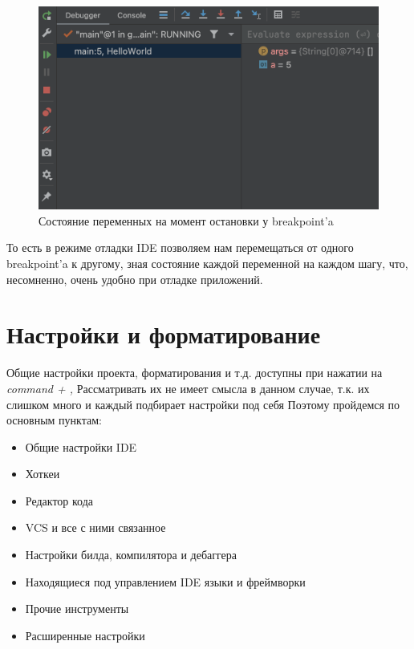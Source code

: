 \documentclass[12pt, a4paper]{article}
\begin{document}
    \begin{figure}[H]
        \centering
        \includegraphics[width=0.75\linewidth]{src/output2.png}
        \caption{Состояние переменных на момент остановки у breakpoint'a}
    \end{figure}

    То есть в режиме отладки IDE позволяем нам перемещаться от одного breakpoint'a к другому, 
    зная состояние каждой переменной на каждом шагу, что, несомненно, очень удобно при отладке 
    приложений.


    \newpage
    \section{Настройки и форматирование}

    Общие настройки проекта, форматирования и т.д. доступны при нажатии на \textit{command + ,}
    Рассматривать их не имеет смысла в данном случае, т.к. их слишком много и каждый подбирает настройки под себя
    Поэтому пройдемся по основным пунктам:
    \begin{itemize}
        \item Общие настройки IDE
        \item Хоткеи
        \item Редактор кода
        \item VCS и все с ними связанное
        \item Настройки билда, компилятора и дебаггера
        \item Находящиеся под управлением IDE языки и фреймворки
        \item Прочие инструменты
        \item Расширенные настройки
    \end{itemize}
\end{document}
